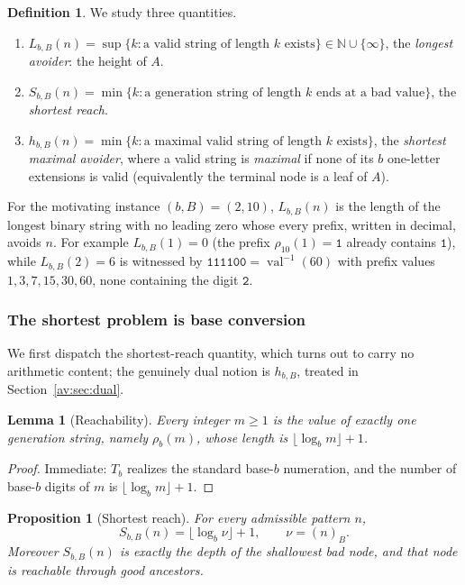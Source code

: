 \documentclass[a4paper]{article}
\theoremstyle{plain}
\newtheorem{proposition}{Proposition}[subsection]
\newtheorem{lemma}{Lemma}[subsection]
\theoremstyle{definition}
\newtheorem{definition}{Definition}[subsection]
\theoremstyle{remark}
\DeclareMathOperator{\val}{val}
\newcommand{\base}[2]{(#1)_{#2}}
\newcommand{\NN}{\mathbb{N}}
\newcommand{\Lbb}[1][b,B]{L_{#1}}
\newcommand{\Sbb}[1][b,B]{S_{#1}}
\newcommand{\hbb}[1][b,B]{h_{#1}}
\begin{document}
\begin{definition}
We study three quantities.
\begin{enumerate}[label=\textup{(\roman*)},leftmargin=2.2em]
\item $\Lbb(n)=\sup\{k:\text{a valid string of length }k\text{ exists}\}\in\NN\cup\{\infty\}$, the \emph{longest avoider}: the height of $A$.
\item $\Sbb(n)=\min\{k:\text{a generation string of length }k\text{ ends at a bad value}\}$, the \emph{shortest reach}.
\item $\hbb(n)=\min\{k:\text{a maximal valid string of length }k\text{ exists}\}$, the \emph{shortest maximal avoider}, where a valid string is \emph{maximal} if none of its $b$ one-letter extensions is valid (equivalently the terminal node is a leaf of $A$).
\end{enumerate}
\end{definition}

For the motivating instance $(b,B)=(2,10)$, $\Lbb(n)$ is the length of the longest binary string with no leading zero whose every prefix, written in decimal, avoids $n$. For example $\Lbb(1)=0$ (the prefix $\rho_{10}(1)=\texttt{1}$ already contains $\texttt{1}$), while $\Lbb(2)=6$ is witnessed by $\texttt{111100}=\val^{-1}(60)$ with prefix values $1,3,7,15,30,60$, none containing the digit $\texttt{2}$.

\subsubsection{The shortest problem is base conversion}

We first dispatch the shortest-reach quantity, which turns out to carry no arithmetic content; the genuinely dual notion is $\hbb$, treated in Section~\ref{av:sec:dual}.

\begin{lemma}[Reachability]\label{av:lem:reach}
Every integer $m\ge 1$ is the value of exactly one generation string, namely $\rho_b(m)$, whose length is $\lfloor\log_b m\rfloor+1$.
\end{lemma}

\begin{proof}
Immediate: $T_b$ realizes the standard base-$b$ numeration, and the number of base-$b$ digits of $m$ is $\lfloor\log_b m\rfloor+1$.
\end{proof}

\begin{proposition}[Shortest reach]\label{av:prop:short}
For every admissible pattern $n$,
\[
\Sbb(n)=\lfloor\log_b \nu\rfloor+1,\qquad \nu=\base{n}{B}.
\]
Moreover $\Sbb(n)$ is exactly the depth of the shallowest bad node, and that node is reachable through good ancestors.
\end{proposition}
\end{document}
